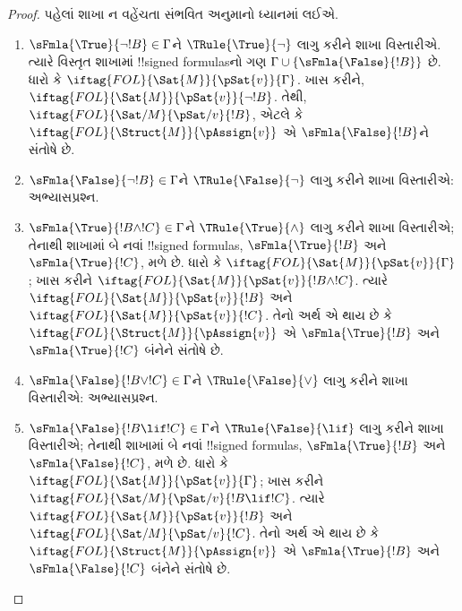 \documentclass[../../../include/open-logic-section]{subfiles}
\begin{document}
\begin{proof}
પહેલાં શાખા ન વહેંચતા સંભવિત અનુમાનો ધ્યાનમાં લઈએ.
\begin{enumerate}
\item $\sFmla{\True}{\lnot !B} \in \Gamma$ને
  $\TRule{\True}{\lnot}$ લાગુ કરીને શાખા વિસ્તારીએ. ત્યારે વિસ્તૃત
  શાખામાં !!{signed formula}sનો ગણ $\Gamma \cup
  \{\sFmla{\False}{!B}\}$ છે. ધારો કે
  $\iftag{FOL}{\Sat{M}}{\pSat{v}}{\Gamma}$. ખાસ કરીને,
  $\iftag{FOL}{\Sat{M}}{\pSat{v}}{\lnot !B}$. તેથી,
  $\iftag{FOL}{\Sat/{M}}{\pSat/{v}}{!B}$, એટલે કે
  $\iftag{FOL}{\Struct{M}}{\pAssign{v}}$ એ
  $\sFmla{\False}{!B}$ને સંતોષે છે.
\item $\sFmla{\False}{\lnot !B} \in \Gamma$ને
  $\TRule{\False}{\lnot}$ લાગુ કરીને શાખા વિસ્તારીએ: અભ્યાસપ્રશ્ન.
\item $\sFmla{\True}{!B \land !C} \in \Gamma$ને
  $\TRule{\True}{\land}$ લાગુ કરીને શાખા વિસ્તારીએ; તેનાથી શાખામાં બે
  નવાં !!{signed formula}s, $\sFmla{\True}{!B}$ અને
  $\sFmla{\True}{!C}$, મળે છે. ધારો કે
  $\iftag{FOL}{\Sat{M}}{\pSat{v}}{\Gamma}$; ખાસ કરીને
  $\iftag{FOL}{\Sat{M}}{\pSat{v}}{!B \land !C}$. ત્યારે
  $\iftag{FOL}{\Sat{M}}{\pSat{v}}{!B}$ અને
  $\iftag{FOL}{\Sat{M}}{\pSat{v}}{!C}$. તેનો અર્થ એ થાય છે કે
  $\iftag{FOL}{\Struct{M}}{\pAssign{v}}$ એ
  $\sFmla{\True}{!B}$ અને $\sFmla{\True}{!C}$ બંનેને સંતોષે છે.
\item $\sFmla{\False}{!B \lor !C} \in \Gamma$ને
  $\TRule{\False}{\lor}$ લાગુ કરીને શાખા વિસ્તારીએ: અભ્યાસપ્રશ્ન.
\item $\sFmla{\False}{!B \lif !C} \in \Gamma$ને
  $\TRule{\False}{\lif}$ લાગુ કરીને શાખા વિસ્તારીએ; તેનાથી શાખામાં બે
  નવાં !!{signed formula}s, $\sFmla{\True}{!B}$ અને
  $\sFmla{\False}{!C}$, મળે છે. ધારો કે
  $\iftag{FOL}{\Sat{M}}{\pSat{v}}{\Gamma}$; ખાસ કરીને
  $\iftag{FOL}{\Sat/{M}}{\pSat/{v}}{!B \lif !C}$. ત્યારે
  $\iftag{FOL}{\Sat{M}}{\pSat{v}}{!B}$ અને
  $\iftag{FOL}{\Sat/{M}}{\pSat/{v}}{!C}$. તેનો અર્થ એ થાય છે કે
  $\iftag{FOL}{\Struct{M}}{\pAssign{v}}$ એ
  $\sFmla{\True}{!B}$ અને $\sFmla{\False}{!C}$ બંનેને સંતોષે છે.

\end{enumerate}
\end{proof}
\end{document}
